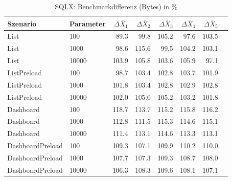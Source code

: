 
\begin{table}[ht]
\setlength{\extrarowheight}{-1pt}
\centering
\caption{SQLX: Benchmarkdifferenz (Bytes) in \%}
\begin{tabular}{llrrrrrr}
\toprule
Szenario & Parameter & ${\Delta \overline{X}_1}$ & ${\Delta \overline{X}_2}$ & ${\Delta \overline{X}_3}$ & ${\Delta \overline{X}_4}$ & ${\Delta \overline{X}_5}$ \\
\midrule
	List & 100 & \cellcolor{green!14}  89.3 &  99.8 & \cellcolor{red!12}  105.2 & \cellcolor{green!11}  97.6 & \cellcolor{red!11}  103.5 \\
	List & 1000 &  98.6 & \cellcolor{red!16}  115.6 &  99.5 & \cellcolor{red!12}  104.2 & \cellcolor{red!11}  103.1 \\
	List & 10000 & \cellcolor{red!12}  103.9 & \cellcolor{red!12}  105.8 & \cellcolor{red!11}  103.6 & \cellcolor{red!12}  105.9 & \cellcolor{green!11}  97.1 \\
	ListPreload & 100 &  98.7 & \cellcolor{red!11}  103.4 & \cellcolor{red!11}  102.8 & \cellcolor{red!11}  103.7 &  101.9 \\
	ListPreload & 1000 &  101.8 & \cellcolor{red!11}  103.4 & \cellcolor{red!11}  102.8 & \cellcolor{red!11}  102.9 & \cellcolor{red!11}  102.8 \\
	ListPreload & 10000 & \cellcolor{red!11}  102.0 & \cellcolor{red!12}  105.0 & \cellcolor{red!12}  105.2 & \cellcolor{red!11}  103.2 &  101.8 \\
	Dashboard & 100 & \cellcolor{red!17}  118.7 & \cellcolor{red!15}  113.7 & \cellcolor{red!16}  115.2 & \cellcolor{red!16}  115.8 & \cellcolor{red!16}  116.2 \\
	Dashboard & 1000 & \cellcolor{red!15}  112.8 & \cellcolor{red!15}  111.5 & \cellcolor{red!16}  115.3 & \cellcolor{red!16}  114.6 & \cellcolor{red!16}  115.1 \\
	Dashboard & 10000 & \cellcolor{red!15}  111.4 & \cellcolor{red!15}  113.1 & \cellcolor{red!16}  114.6 & \cellcolor{red!15}  113.3 & \cellcolor{red!15}  113.1 \\
	DashboardPreload & 100 & \cellcolor{red!14}  109.3 & \cellcolor{red!13}  107.1 & \cellcolor{red!14}  109.9 & \cellcolor{red!14}  110.2 & \cellcolor{red!14}  110.0 \\
	DashboardPreload & 1000 & \cellcolor{red!13}  107.7 & \cellcolor{red!13}  107.3 & \cellcolor{red!14}  109.3 & \cellcolor{red!13}  108.7 & \cellcolor{red!13}  108.0 \\
	DashboardPreload & 10000 & \cellcolor{red!13}  106.3 & \cellcolor{red!13}  108.3 & \cellcolor{red!14}  109.6 & \cellcolor{red!13}  108.1 & \cellcolor{red!13}  107.1 \\
\bottomrule
\end{tabular}
\label{tab:benchmarkdifferenz_sqlx_bytes}
\end{table}
	